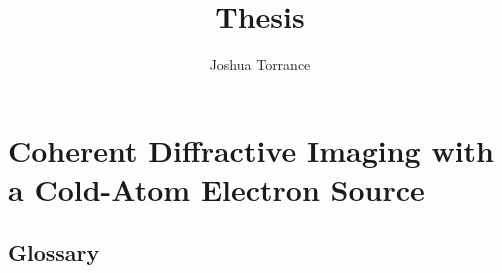 \documentclass[11pt]{report}
\begin{document}
\title{Thesis}

\author{Joshua Torrance}

\maketitle






\tableofcontents




\part{Coherent Diffractive Imaging with a Cold-Atom Electron Source}

\appendix
\chapter{Glossary}
\printglossary


\renewcommand\bibname{References}

\end{document}
